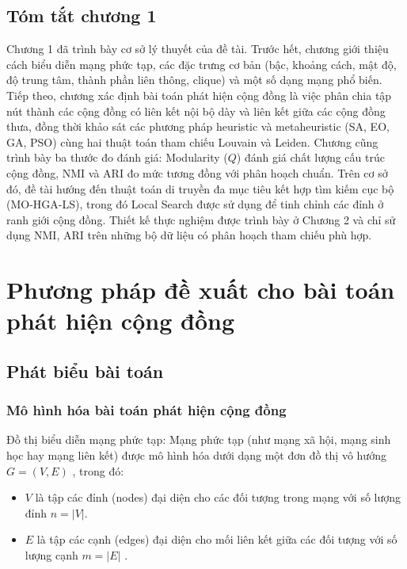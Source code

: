 \documentclass[14pt,a4paper]{extarticle}
\begin{document}
\subsection{Tóm tắt chương 1}
Chương 1 đã trình bày cơ sở lý thuyết của đề tài. Trước hết, chương giới thiệu cách biểu diễn mạng phức tạp, các đặc trưng cơ bản (bậc, khoảng cách, mật độ, độ trung tâm, thành phần liên thông, clique) và một số dạng mạng phổ biến. Tiếp theo, chương xác định bài toán phát hiện cộng đồng là việc phân chia tập nút thành các cộng đồng có liên kết nội bộ dày và liên kết giữa các cộng đồng thưa, đồng thời khảo sát các phương pháp heuristic và metaheuristic (SA, EO, GA, PSO) cùng hai thuật toán tham chiếu Louvain và Leiden. Chương cũng trình bày ba thước đo đánh giá: Modularity ($Q$) đánh giá chất lượng cấu trúc cộng đồng, NMI và ARI đo mức tương đồng với phân hoạch chuẩn. Trên cơ sở đó, đề tài hướng đến thuật toán di truyền đa mục tiêu kết hợp tìm kiếm cục bộ (MO-HGA-LS), trong đó Local Search được sử dụng để tinh chỉnh các đỉnh ở ranh giới cộng đồng. Thiết kế thực nghiệm được trình bày ở Chương 2 và chỉ sử dụng NMI, ARI trên những bộ dữ liệu có phân hoạch tham chiếu phù hợp.

\newpage
\section{Phương pháp đề xuất cho bài toán phát hiện cộng đồng}

\subsection{Phát biểu bài toán}

\subsubsection{Mô hình hóa bài toán phát hiện cộng đồng}
Đồ thị biểu diễn mạng phức tạp: Mạng phức tạp (như mạng xã hội, mạng sinh học hay mạng liên kết) được mô hình hóa dưới dạng một đơn đồ thị vô hướng $G=(V,E)$ \cite{Taillard2023}, trong đó:
\begin{itemize}
    \item $V$ là tập các đỉnh (nodes) đại diện cho các đối tượng trong mạng với số lượng đỉnh $n = |V|$.
    \item $E$ là tập các cạnh (edges) đại diện cho mối liên kết giữa các đối tượng với số lượng cạnh $m = |E|$ \cite{Taillard2023}.
\end{itemize}
\end{document}
